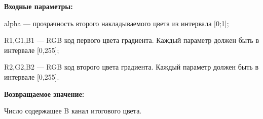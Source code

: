 \textbf{Входные параметры:}  

alpha --- прозрачность второго накладываемого цвета из интервала [0;1];
 
    R1,G1,B1 --- RGB код первого цвета градиента. Каждый параметр должен быть в интервале [0,255];
 
    R2,G2,B2 --- RGB код второго цвета градиента. Каждый параметр должен быть в интервале [0,255].

\textbf{Возвращаемое значение:}

Число содержащее B канал итогового цвета.